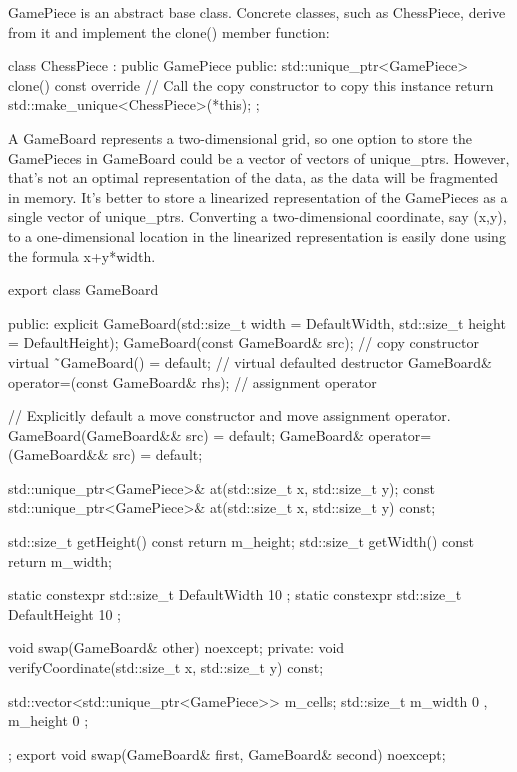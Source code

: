 GamePiece is an abstract base class. Concrete classes, such as ChessPiece, derive from it and implement the clone() member function:

\begin{cpp}
class ChessPiece : public GamePiece
{
    public:
        std::unique_ptr<GamePiece> clone() const override
        {
            // Call the copy constructor to copy this instance
            return std::make_unique<ChessPiece>(*this);
        }
};
\end{cpp}

A GameBoard represents a two-dimensional grid, so one option to store the GamePieces in GameBoard could be a vector of vectors of unique\_ptrs. However, that’s not an optimal representation of the data, as the data will be fragmented in memory. It’s better to store a linearized representation of the GamePieces as a single vector of unique\_ptrs. Converting a two-dimensional coordinate, say (x,y), to a one-dimensional location in the linearized representation is easily done using the formula x+y*width.

\begin{cpp}
export class GameBoard
{
    public:
        explicit GameBoard(std::size_t width = DefaultWidth,
            std::size_t height = DefaultHeight);
        GameBoard(const GameBoard& src); // copy constructor
        virtual ˜GameBoard() = default; // virtual defaulted destructor
        GameBoard& operator=(const GameBoard& rhs); // assignment operator

        // Explicitly default a move constructor and move assignment operator.
        GameBoard(GameBoard&& src) = default;
        GameBoard& operator=(GameBoard&& src) = default;

        std::unique_ptr<GamePiece>& at(std::size_t x, std::size_t y);
        const std::unique_ptr<GamePiece>& at(std::size_t x, std::size_t y) const;

        std::size_t getHeight() const { return m_height; }
        std::size_t getWidth() const { return m_width; }

        static constexpr std::size_t DefaultWidth { 10 };
        static constexpr std::size_t DefaultHeight { 10 };

        void swap(GameBoard& other) noexcept;
    private:
        void verifyCoordinate(std::size_t x, std::size_t y) const;

        std::vector<std::unique_ptr<GamePiece>> m_cells;
        std::size_t m_width { 0 }, m_height { 0 };
};
export void swap(GameBoard& first, GameBoard& second) noexcept;
\end{cpp}

